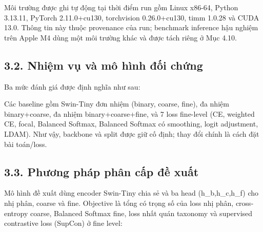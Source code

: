 \documentclass[
  10pt,
  a4paper,
  twocolumn]{article}
\begin{document}
Môi trường được ghi tự động tại thời điểm run gồm Linux x86-64, Python
3.13.11, PyTorch 2.11.0+cu130, torchvision 0.26.0+cu130, timm 1.0.28 và
CUDA 13.0. Thông tin này thuộc provenance của run; benchmark inference
hậu nghiệm trên Apple M4 dùng một môi trường khác và được tách riêng ở
Mục 4.10.

\subsection{3.2. Nhiệm vụ và mô hình đối
chứng}\label{nhiux1ec7m-vux1ee5-vuxe0-muxf4-huxecnh-ux111ux1ed1i-chux1ee9ng}

Ba mức đánh giá được định nghĩa như sau:

\begin{table}[htbp]
\centering
\caption{Định nghĩa các mức đánh giá đa tầng (hierarchical evaluation levels).}
\label{tab:table4}
\vspace{2pt}
\end{table}

Các baseline gồm Swin-Tiny đơn nhiệm (binary, coarse, fine), đa nhiệm
binary+coarse, đa nhiệm binary+coarse+fine, và 7 loss fine-level (CE,
weighted CE, focal, Balanced Softmax, Balanced Softmax có smoothing,
logit adjustment, LDAM). Như vậy, backbone và split được giữ cố định;
thay đổi chính là cách đặt bài toán/loss.

\subsection{3.3. Phương pháp phân cấp đề
xuất}\label{phux1b0ux1a1ng-phuxe1p-phuxe2n-cux1ea5p-ux111ux1ec1-xuux1ea5t}

Mô hình đề xuất dùng encoder Swin-Tiny chia sẻ và ba head
(h\_b,h\_c,h\_f) cho nhị phân, coarse và fine. Objective là tổng có
trọng số của loss nhị phân, cross-entropy coarse, Balanced Softmax fine,
loss nhất quán taxonomy và supervised contrastive loss (SupCon) ở fine
level:
\end{document}
